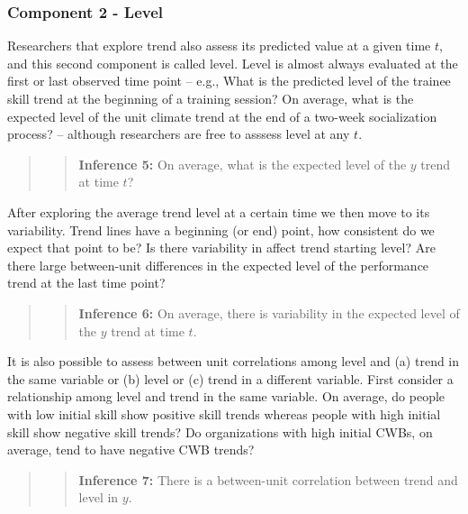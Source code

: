 \documentclass[english,,man]{apa6}
\theoremstyle{definition}
\theoremstyle{definition}
\theoremstyle{definition}
\theoremstyle{remark}
\begin{document}
\hypertarget{component-2---level}{%
\subsubsection{Component 2 - Level}\label{component-2---level}}

Researchers that explore trend also assess its predicted value at a
given time \(t\), and this second component is called level. Level is
almost always evaluated at the first or last observed time point --
e.g., What is the predicted level of the trainee skill trend at the
beginning of a training session? On average, what is the expected level
of the unit climate trend at the end of a two-week socialization
process? -- although researchers are free to asssess level at any \(t\).

\begin{quote}
\begin{quote}
\textbf{Inference 5:} On average, what is the expected level of the
\(y\) trend at time \(t\)?
\end{quote}
\end{quote}

After exploring the average trend level at a certain time we then move
to its variability. Trend lines have a beginning (or end) point, how
consistent do we expect that point to be? Is there variability in affect
trend starting level? Are there large between-unit differences in the
expected level of the performance trend at the last time point?

\begin{quote}
\begin{quote}
\textbf{Inference 6:} On average, there is variability in the expected
level of the \(y\) trend at time \(t\).
\end{quote}
\end{quote}

It is also possible to assess between unit correlations among level and
(a) trend in the same variable or (b) level or (c) trend in a different
variable. First consider a relationship among level and trend in the
same variable. On average, do people with low initial skill show
positive skill trends whereas people with high initial skill show
negative skill trends? Do organizations with high initial CWBs, on
average, tend to have negative CWB trends?

\begin{quote}
\begin{quote}
\textbf{Inference 7:} There is a between-unit correlation between trend
and level in \(y\).
\end{quote}
\end{quote}
\end{document}
